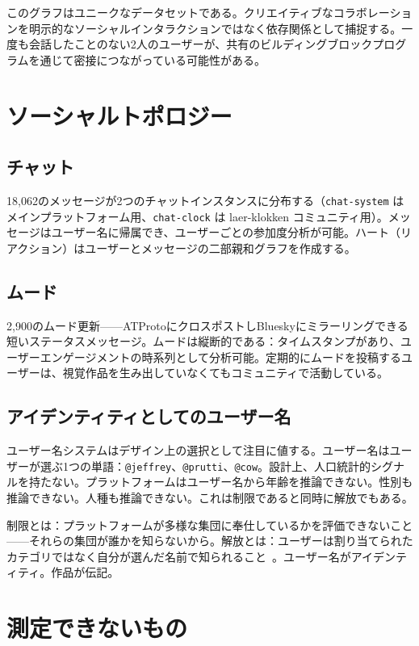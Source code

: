 \documentclass[10pt,letterpaper,twocolumn]{article}
\begin{document}
このグラフはユニークなデータセットである。クリエイティブなコラボレーションを明示的なソーシャルインタラクションではなく依存関係として捕捉する。一度も会話したことのない2人のユーザーが、共有のビルディングブロックプログラムを通じて密接につながっている可能性がある。

\section{ソーシャルトポロジー}

\subsection{チャット}

18,062のメッセージが2つのチャットインスタンスに分布する（\texttt{chat-system} はメインプラットフォーム用、\texttt{chat-clock} は laer-klokken コミュニティ用）。メッセージはユーザー名に帰属でき、ユーザーごとの参加度分析が可能。ハート（リアクション）はユーザーとメッセージの二部親和グラフを作成する。

\subsection{ムード}

2,900のムード更新——ATProtoにクロスポストしBlueskyにミラーリングできる短いステータスメッセージ。ムードは縦断的である：タイムスタンプがあり、ユーザーエンゲージメントの時系列として分析可能。定期的にムードを投稿するユーザーは、視覚作品を生み出していなくてもコミュニティで活動している。

\subsection{アイデンティティとしてのユーザー名}

ユーザー名システムはデザイン上の選択として注目に値する。ユーザー名はユーザーが選ぶ1つの単語：\texttt{@jeffrey}、\texttt{@prutti}、\texttt{@cow}。設計上、人口統計的シグナルを持たない。プラットフォームはユーザー名から年齢を推論できない。性別も推論できない。人種も推論できない。これは制限であると同時に解放でもある。

制限とは：プラットフォームが多様な集団に奉仕しているかを評価できないこと——それらの集団が誰かを知らないから。解放とは：ユーザーは割り当てられたカテゴリではなく自分が選んだ名前で知られること~\citep{costanzachock2020design}。ユーザー名がアイデンティティ。作品が伝記。

\section{測定できないもの}
\end{document}
